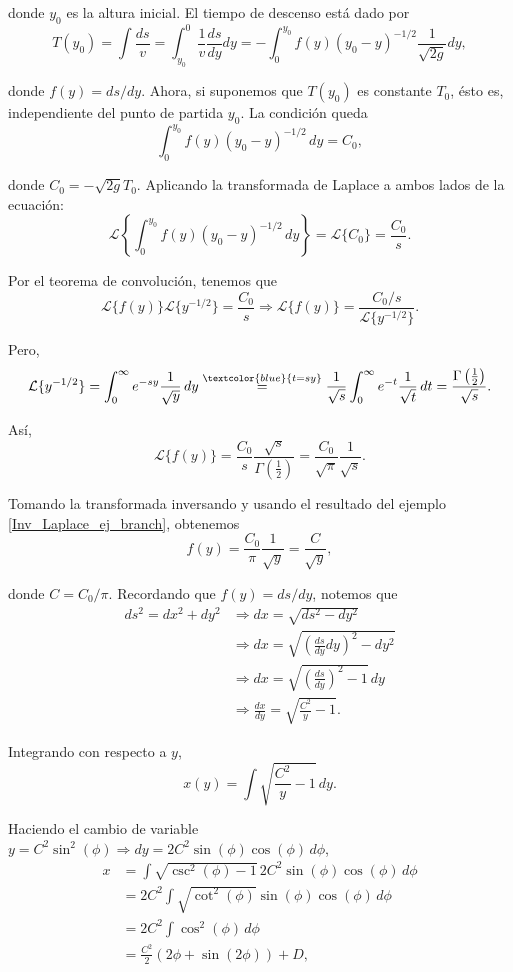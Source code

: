 \begin{ejemplo}
    donde $y_0$ es la altura inicial. El tiempo de descenso está dado por
    $$T(y_0) = \int \frac{ds}{v} = \int_{y_0}^0 \frac{1}{v} \frac{ds}{dy} dy = - \int_0^{y_0} f(y) (y_0 - y)^{-1/2} \frac{1}{\sqrt{2g}} dy,$$

    donde $f(y) = ds/dy$. Ahora, si suponemos que $T(y_0)$ es constante $T_0$, ésto es, independiente del punto de partida $y_0$. La condición queda
    $$\int_0^{y_0} f(y) (y_0 - y)^{-1/2} \,dy = C_0,$$

    donde $C_0 = -\sqrt{2g} T_0$. Aplicando la transformada de Laplace  a ambos lados de la ecuación:
    $$\mathcal{L}\left\{\int_0^{y_0} f(y) (y_0 - y)^{-1/2} \,dy \right\} = \mathcal{L}\{C_0\} = \frac{C_0}{s}.$$
    
    Por el teorema de convolución, tenemos que
    $$\mathcal{L}\{f(y)\} \mathcal{L}\{y^{-1/2}\} = \frac{C_0}{s} \Rightarrow \mathcal{L}\{f(y)\} = \frac{C_0/s}{\mathcal{L}\{y^{-1/2}\}}.$$

    Pero,
    $$\mathcal{L}\{y^{-1/2}\} = \int_0^{\infty} e^{-sy} \frac{1}{\sqrt{y}} \,dy \overset{\textcolor{blue}{t = sy}}{=} \frac{1}{\sqrt{s}}\int_0^{\infty} e^{-t} \frac{1}{\sqrt{t}} \,dt = \frac{\Gamma\left(\frac{1}{2}\right)}{\sqrt{s}}.$$

    Así,
    $$\mathcal{L}\{f(y)\} = \frac{C_0}{s} \frac{\sqrt{s}}{\Gamma\left(\frac{1}{2}\right)} = \frac{C_0}{\sqrt{\pi}} \frac{1}{\sqrt{s}}.$$

    Tomando la transformada inversando y usando el resultado del ejemplo \ref{Inv_Laplace_ej_branch}, obtenemos 
    $$f(y) = \frac{C_0}{\pi} \frac{1}{\sqrt{y}} = \frac{C}{\sqrt{y}},$$

    donde $C = C_0/\pi$. Recordando que $f(y) = ds/dy$, notemos que
    \begin{align*}
        ds^2 = dx^2 + dy^2 &\Rightarrow dx = \sqrt{ds^2 - dy^2} \\
        &\Rightarrow dx = \sqrt{\left( \frac{ds}{dy} dy\right)^2 - dy^2} \\
        &\Rightarrow dx = \sqrt{\left(\frac{ds}{dy}\right)^2 - 1} \,dy \\
        &\Rightarrow \frac{dx}{dy} = \sqrt{\frac{C^2}{y} - 1}. 
    \end{align*}

    Integrando con respecto a $y$,
    $$x(y) = \int \sqrt{\frac{C^2}{y} - 1} \,dy.$$

    Haciendo el cambio de variable $y = C^2 \sin^2 (\phi) \Rightarrow dy = 2 C^2 \sin(\phi) \cos(\phi) \,d\phi$,
    \begin{align*}
        x &= \int \sqrt{\csc^2(\phi) - 1} \, 2 C^2 \sin(\phi) \cos(\phi) \,d\phi \\
        &= 2C^2 \int \sqrt{\cot^2(\phi)}  \sin(\phi) \cos(\phi) \,d\phi \\
        &= 2C^2 \int \cos^2(\phi) \,d\phi \\
        &=  \frac{C^2}{2} (2\phi + \sin(2\phi)) + D,
    \end{align*}


\end{ejemplo}

